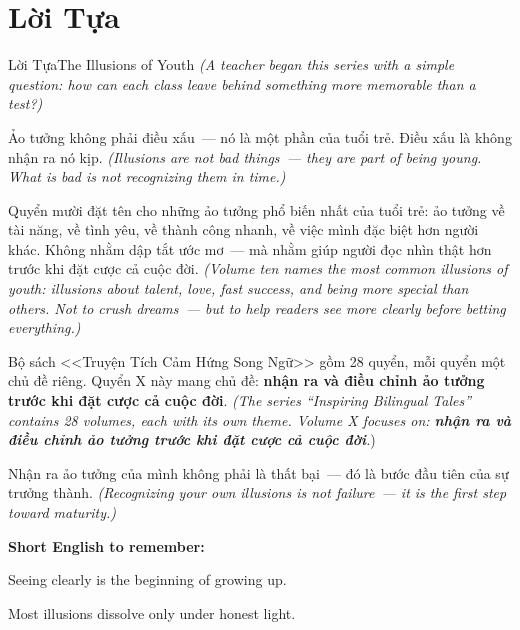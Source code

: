 \chapter*{Lời Tựa}

\begin{truyen}{Lời Tựa}{The Illusions of Youth}
\textit{(A teacher began this series with a simple question: how can each class leave behind something more memorable than a test?)}

Ảo tưởng không phải điều xấu~--- nó là một phần của tuổi trẻ. Điều xấu là không nhận ra nó kịp.
\textit{(Illusions are not bad things~--- they are part of being young. What is bad is not recognizing them in time.)}

Quyển mười đặt tên cho những ảo tưởng phổ biến nhất của tuổi trẻ: ảo tưởng về tài năng, về tình yêu, về thành công nhanh, về việc mình đặc biệt hơn người khác. Không nhằm dập tắt ước mơ~--- mà nhằm giúp người đọc nhìn thật hơn trước khi đặt cược cả cuộc đời.
\textit{(Volume ten names the most common illusions of youth: illusions about talent, love, fast success, and being more special than others. Not to crush dreams~--- but to help readers see more clearly before betting everything.)}

Bộ sách <<Truyện Tích Cảm Hứng Song Ngữ>> gồm 28 quyển, mỗi quyển một chủ đề riêng. Quyển X này mang chủ đề: \textbf{nhận ra và điều chỉnh ảo tưởng trước khi đặt cược cả cuộc đời}.
\textit{(The series ``Inspiring Bilingual Tales'' contains 28 volumes, each with its own theme. Volume X focuses on: \textbf{nhận ra và điều chỉnh ảo tưởng trước khi đặt cược cả cuộc đời}.})
\end{truyen}

\begin{baihoc}
Nhận ra ảo tưởng của mình không phải là thất bại~--- đó là bước đầu tiên của sự trưởng thành.
\textit{(Recognizing your own illusions is not failure~--- it is the first step toward maturity.)}
\end{baihoc}

\begin{ghinhoanh}
\textbf{Short English to remember:}

Seeing clearly is the beginning of growing up.

Most illusions dissolve only under honest light.
\end{ghinhoanh}

